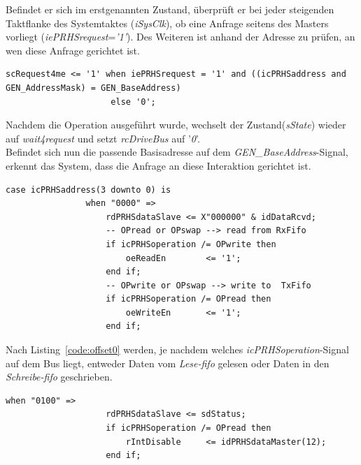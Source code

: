  Befindet er sich im erstgenannten Zustand, überprüft er bei jeder steigenden Taktflanke des
 Systemtaktes (\emph{iSysClk}), ob eine Anfrage seitens des Masters vorliegt (\emph{iePRHSrequest}=\emph{'1'}). Des Weiteren ist
 anhand der Adresse zu prüfen, an wen diese Anfrage gerichtet ist.
 \begin{lstlisting}[caption={Abgleichen der Adresse},label={code:adressabgleich}]
   scRequest4me <= '1' when iePRHSrequest = '1' and ((icPRHSaddress and GEN_AddressMask) = GEN_BaseAddress)
                     else '0';

 \end{lstlisting}
 Nachdem die Operation ausgeführt wurde, wechselt der Zustand(\emph{sState}) wieder auf \emph{wait4request} und
 setzt \emph{rcDriveBus} auf '\emph{0}'.\\
 Befindet sich nun die passende Basisadresse auf dem \emph{GEN\_BaseAddress}-Signal, erkennt das System,
 dass die Anfrage an diese Interaktion gerichtet ist.\\

 \begin{lstlisting}[caption={Basisadresse + \emph{Adressoffset}='\emph{0}' },label={code:offset0}]
            case icPRHSaddress(3 downto 0) is
                when "0000" =>
                    rdPRHSdataSlave <= X"000000" & idDataRcvd;
                    -- OPread or OPswap --> read from RxFifo
                    if icPRHSoperation /= OPwrite then
                        oeReadEn        <= '1';
                    end if;
                    -- OPwrite or OPswap --> write to  TxFifo
                    if icPRHSoperation /= OPread then
                        oeWriteEn       <= '1';
                    end if;
 \end{lstlisting}

 Nach Listing~\ref{code:offset0} werden, je nachdem welches \emph{icPRHSoperation}-Signal auf dem Bus liegt,
 entweder Daten vom \emph{Lese-\ac{fifo}} gelesen oder Daten in den \emph{Schreibe-\ac{fifo}} geschrieben.

 \begin{lstlisting}[caption={Basisadresse + \emph{Adressoffset}='\emph{4}' },label={code:offset4}]
                 when "0100" =>
                    rdPRHSdataSlave <= sdStatus;
                    if icPRHSoperation /= OPread then
                        rIntDisable     <= idPRHSdataMaster(12);
                    end if;

 \end{lstlisting}

